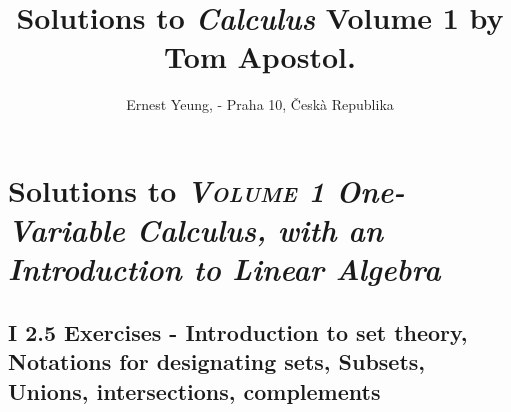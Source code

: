 \documentclass[twoside]{amsart}
\title{	Solutions to \emph{ Calculus } Volume 1 by Tom Apostol.	}
\author{
  Ernest Yeung,  - Praha 10, \v Cesk\`a Republika 
       }
\theoremstyle{plain}
\theoremstyle{definition}
\begin{document}

\maketitle

\section*{Solutions to \emph{ \textsc{ Volume 1} One-Variable Calculus, with an Introduction to Linear Algebra } }

\subsection*{ I 2.5 Exercises - Introduction to set theory, Notations for designating sets, Subsets, Unions, intersections, complements }
\end{document}
